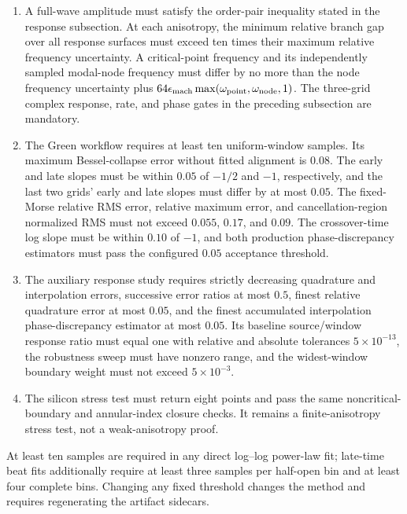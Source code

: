 {\begin{enumerate}
\item A full-wave amplitude must satisfy the order-pair inequality stated in
the response subsection.  At each anisotropy, the minimum relative branch gap
over all response surfaces must exceed ten times their maximum relative
frequency uncertainty.  A critical-point frequency
and its independently sampled modal-node frequency must differ by no more
than the node frequency uncertainty plus
\(64\epsilon_{\rm mach}\max(\omega_{\rm point},\omega_{\rm node},1)\).
The three-grid complex response, rate, and phase gates in the preceding
subsection are mandatory.

\item The Green workflow requires at least ten uniform-window samples.  Its
maximum Bessel-collapse error without fitted alignment is \(0.08\).  The early and late
slopes must be within \(0.05\) of \(-1/2\) and \(-1\), respectively, and the
last two grids' early and late slopes must differ by at most \(0.05\).  The
fixed-Morse relative RMS error, relative maximum error, and cancellation-region
normalized RMS must not exceed \(0.055\), \(0.17\), and \(0.09\).  The
crossover-time log slope must be within \(0.10\) of \(-1\), and both
production phase-discrepancy estimators must pass the configured \(0.05\)
acceptance threshold.

\item The auxiliary response study requires strictly decreasing quadrature
and interpolation errors, successive error ratios at most \(0.5\), finest
relative quadrature error at most \(0.05\), and the finest accumulated
interpolation phase-discrepancy estimator at most \(0.05\).  Its baseline source/window response
ratio must equal one with relative and absolute tolerances
\(5\times10^{-13}\), the robustness sweep must have nonzero range, and the
widest-window boundary weight must not exceed \(5\times10^{-3}\).

\item The silicon stress test must return eight points and pass the same
noncritical-boundary and annular-index closure checks.  It remains a
finite-anisotropy stress test, not a weak-anisotropy proof.
\end{enumerate}
}

At least ten samples are required in any direct log--log power-law fit;
late-time beat fits additionally require at least three samples per half-open
bin and at least four complete bins.  Changing any fixed threshold changes
the method and requires regenerating the artifact sidecars.


